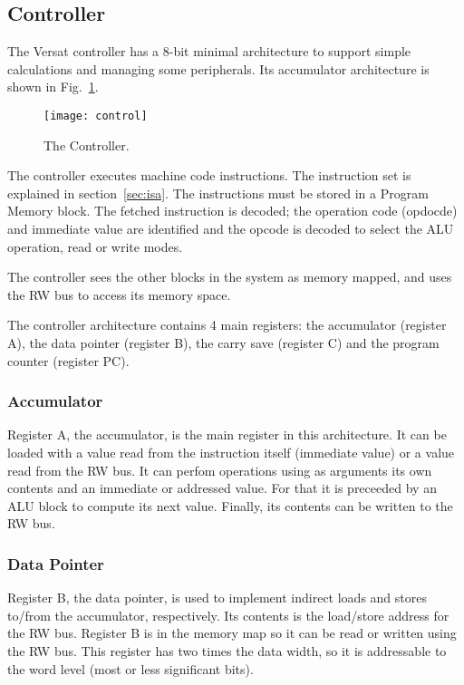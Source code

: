 \subsection{Controller}

The Versat controller has a 8-bit minimal architecture to support
simple calculations and managing some peripherals. Its accumulator
architecture is shown in Fig.~\ref{fig:control}.

\begin{figure}[!htbp]
    \centerline{\texttt{[image: control]}}
    \vspace{0cm}\caption{The Controller.}
    \label{fig:control}
\end{figure}

The controller executes machine code instructions. The instruction set
is explained in section~\ref{sec:isa}. The instructions must be stored in
a Program Memory block. The fetched instruction is decoded; the
operation code (opdocde) and immediate value are identified and the
opcode is decoded to select the ALU operation, read or write modes.

The controller sees the other blocks in the system as memory mapped,
and uses the RW bus to access its memory space.

The controller architecture contains 4 main registers: the accumulator
(register A), the data pointer (register B), the carry save (register
C) and the program counter (register PC).

\subsubsection{Accumulator}

Register A, the accumulator, is the main register in this
architecture. It can be loaded with a value read from the instruction
itself (immediate value) or a value read from the RW bus. It can
perfom operations using as arguments its own contents and an immediate
or addressed value. For that it is preceeded by an ALU block to
compute its next value. Finally, its contents can be written to the RW
bus.

\subsubsection{Data Pointer}

Register B, the data pointer, is used to implement indirect loads and
stores to/from the accumulator, respectively. Its contents is the
load/store address for the RW bus. Register B is in the memory map so
it can be read or written using the RW bus. This register has two
times the data width, so it is addressable to the word level (most or
less significant bits).

